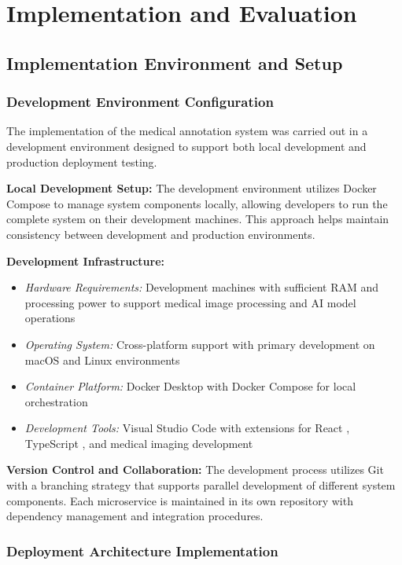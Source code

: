 \chapter{Implementation and Evaluation}

\section{Implementation Environment and Setup}

\subsection{Development Environment Configuration}

The implementation of the medical annotation system was carried out in a development environment designed to support both local development and production deployment testing.

\textbf{Local Development Setup:} The development environment utilizes Docker Compose to manage system components locally, allowing developers to run the complete system on their development machines. This approach helps maintain consistency between development and production environments.

\textbf{Development Infrastructure:}
\begin{itemize}
    \item \textit{Hardware Requirements:} Development machines with sufficient RAM and processing power to support medical image processing and AI model operations
    \item \textit{Operating System:} Cross-platform support with primary development on macOS and Linux environments
    \item \textit{Container Platform:} Docker Desktop with Docker Compose for local orchestration
    \item \textit{Development Tools:} Visual Studio Code with extensions for React \cite{react2023}, TypeScript \cite{typescript2023}, and medical imaging development
\end{itemize}

\textbf{Version Control and Collaboration:} The development process utilizes Git with a branching strategy that supports parallel development of different system components. Each microservice is maintained in its own repository with dependency management and integration procedures.

\subsection{Deployment Architecture Implementation}

